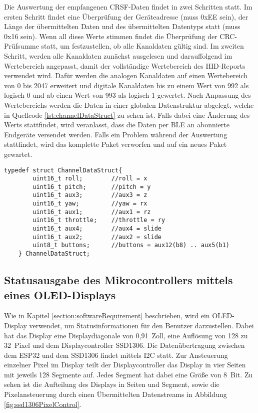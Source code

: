 Die Auswertung der empfangenen CRSF-Daten findet in zwei Schritten statt. Im ersten Schritt findet eine Überprüfung der Geräteadresse (muss 0xEE sein), der Länge der übermittelten Daten und des übermittelten Datentyps statt (muss 0x16 sein). Wenn all diese Werte stimmen findet die Überprüfung der \ac{CRC}-Prüfsumme statt, um festzustellen, ob alle Kanaldaten gültig sind. Im zweiten Schritt, werden alle Kanaldaten zunächst ausgelesen und darauffolgend im Wertebereich angepasst, damit der vollständige Wertebereich des \ac{HID}-Reports verwendet wird. Dafür werden die analogen Kanaldaten auf einen Wertebereich von 0 bis 2047 erweitert und digitale Kanaldaten bis zu einem Wert von 992 als logisch 0 und ab einen Wert von 993 als logisch 1 gewertet. Nach Anpassung des Wertebereichs werden die Daten in einer globalen Datenstruktur abgelegt, welche in Quellcode \ref{lst:channelDataStruct} zu sehen ist. Falls dabei eine Änderung des Werts stattfindet, wird veranlasst, dass die Daten per \ac{BLE} an abonnierte Endgeräte versendet werden. Falls ein Problem während der Auswertung stattfindet, wird das komplette Paket verworfen und auf ein neues Paket gewartet.

\begin{lstlisting}[caption=C-Strukuraufbau der aufbereiteten Kanaldaten, label={lst:channelDataStruct}, style=generalStyle]
    typedef struct ChannelDataStruct{
        uint16_t roll;        //roll = x
        uint16_t pitch;       //pitch = y
        uint16_t aux3;        //aux3 = z
        uint16_t yaw;         //yaw = rx
        uint16_t aux1;        //aux1 = rz
        uint16_t throttle;    //throttle = ry
        uint16_t aux4;        //aux4 = slide
        uint16_t aux2;        //aux2 = slide
        uint8_t buttons;      //buttons = aux12(b8) .. aux5(b1)
    } ChannelDataStruct;
\end{lstlisting}

\subsection{Statusausgabe des Mikrocontrollers mittels eines \acs{OLED}-Displays}
Wie in Kapitel \ref{section:softwareRequirement} beschrieben, wird ein \acs{OLED}-Display verwendet, um Statusinformationen für den Benutzer darzustellen. Dabei hat das Display eine Displaydiagonale von 0,91~Zoll, eine Auflösung von 128 zu 32~Pixel und dem Displaycontroller SSD1306. Die Datenübertragung zwischen dem ESP32 und dem SSD1306 findet mittels \ac{I2C} statt. Zur Ansteuerung einzelner Pixel im Display teilt der Displaycontroller das Display in vier Seiten mit jeweils 128 Segmente auf. Jedes Segment hat dabei eine Größe von 8~Bit. Zu sehen ist die Aufteilung des Displays in Seiten und Segment, sowie die Pixelansteuerung durch einen Übermittelten Datenstreams in Abbildung \ref{fig:ssd1306PixelControl}.

